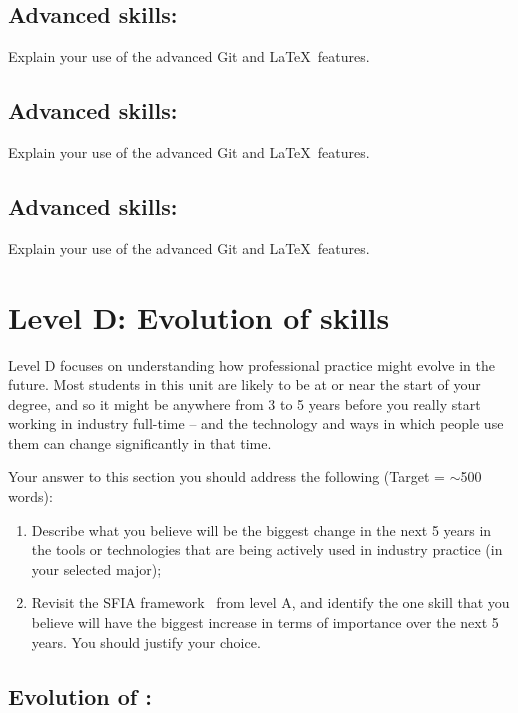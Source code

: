 \documentclass[a4paper, 11pt]{report}
\begin{document}
\subsection{Advanced skills: \studB}

Explain your use of the advanced Git and \LaTeX\ features. 

\subsection{Advanced skills: \studC}

Explain your use of the advanced Git and \LaTeX\ features. 

\subsection{Advanced skills: \studD}

Explain your use of the advanced Git and \LaTeX\ features. 




\newpage
\section{Level D: Evolution of skills}

Level D focuses on understanding how professional practice might evolve in the future. Most students in this unit are likely to be at or near the start of your degree, and so it might be anywhere from 3 to 5 years before you really start working in industry full-time -- and the technology and ways in which people use them can change significantly in that time. 

Your answer to this section you should address the following (Target = $\sim$500 words):
\begin{enumerate}
	\item Describe what you believe will be the biggest change in the next 5 years in the tools or technologies that are being actively used in industry practice (in your selected major);
	\item Revisit the SFIA framework~\cite{sfia} from level A, and identify the one skill that you believe will have the biggest increase in terms of importance over the next 5 years. You should justify your choice.
\end{enumerate}


\subsection{Evolution of \majA: \studA}
\end{document}
